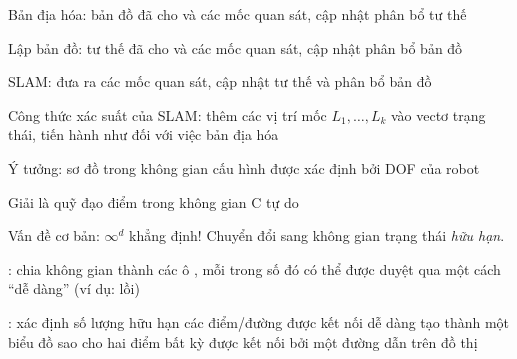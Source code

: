 \documentclass{article}
\begin{document}
\begin{huge}
Bản địa hóa: bản đồ đã cho và các mốc quan sát, cập nhật phân bổ tư thế

Lập bản đồ: tư thế đã cho và các mốc quan sát, cập nhật phân bổ bản đồ

SLAM: đưa ra các mốc quan sát, cập nhật tư thế và phân bổ bản đồ

Công thức xác suất của SLAM: \al
 thêm các vị trí mốc $L_1,\ldots,L_k$ vào vectơ trạng thái,\al
 tiến hành như đối với việc bản địa hóa


\qquad

\centerline{\textheight{}\qquad{}\textheight{}}
\centerline{\textheight{}\qquad{}\textheight{}}


\vspace*{0.2in}



Ý tưởng: sơ đồ trong không gian cấu hình  được xác định bởi DOF của robot


\centerline{  \qquad {} }

Giải là quỹ đạo điểm trong không gian C tự do


Vấn đề cơ bản: $\infty^d$ khẳng định! Chuyển đổi sang không gian trạng thái \emph{hữu hạn}.

:\al
  chia không gian thành các ô , \al
  mỗi trong số đó có thể được duyệt qua một cách “dễ dàng” (ví dụ: lồi)

: \al
  xác định số lượng hữu hạn các điểm/đường được kết nối dễ dàng\al
  tạo thành một biểu đồ sao cho hai điểm bất kỳ được kết nối\al
  bởi một đường dẫn trên đồ thị



\end{huge}
\end{document}
